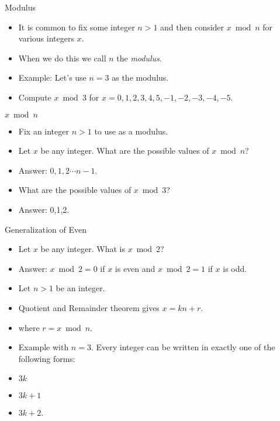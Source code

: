 \documentclass[handout]{beamer}
\begin{document}
\begin{frame}{Modulus}

\begin{itemize}
 \item It is common to fix some integer $n>1$ and then consider $x\bmod n$
 for various integers $x$.
 \item When we do this we call $n$ the \emph{modulus}.
 \item Example: Let's use $n=3$ as the modulus.
 \item Compute $x\bmod 3$ for $x = 0,1,2,3,4,5,-1,-2,-3,-4,-5$.
\end{itemize}

\end{frame}

\begin{frame}{$x\bmod n$}

\begin{itemize}
 \item Fix an integer $n>1$ to use as a modulus.
 \item Let $x$ be any integer. What are the possible values of $x\bmod n$?
 \item Answer: $0,1,2\cdots n-1$.
 \item What are the possible values of $x\bmod 3$?
 \item Answer: 0,1,2.
\end{itemize}

\end{frame}

\begin{frame}{Generalization of Even}

\begin{itemize}
 \item Let $x$ be any integer. What is $x\bmod 2$?
 \item Answer: $x\bmod 2 = 0$ if $x$ is even and $x\bmod 2 = 1$ if $x$ is odd.
 \item Let $n>1$ be an integer.
 \item Quotient and Remainder theorem gives $x=kn+r$.
 \item where $r=x\bmod n$.
 \item Example with $n=3$. Every integer can be written in exactly one of the following forms:
 \item $3k$
 \item $3k+1$
 \item $3k+2$.
\end{itemize}

\end{frame}
\end{document}
